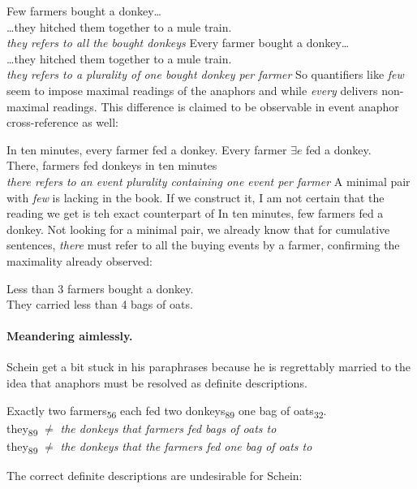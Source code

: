 \documentclass[english]{article}
\newcommand{\fg}{\color{darkred}}
\newcommand{\bg}{\color{blueish}}
\begin{document}
\pex
\a 
Few farmers bought a donkey\ldots\\
\ldots they hitched them together to a mule train.\\
\emph{they refers to all the bought donkeys}
\a 
Every farmer bought a donkey\ldots\\
\ldots they hitched them together to a mule train.\\
\emph{they refers to a plurality of one bought donkey per farmer}
\xe
%
So quantifiers like \emph{few} seem to impose maximal readings of the anaphors and while \emph{every} delivers non-maximal readings. This difference is claimed to be observable in event anaphor cross-reference as well:

\pex
\a 
In ten minutes, every farmer fed a donkey.
\a 
Every farmer $\exists e$ fed a donkey.\\
There, farmers fed donkeys in ten minutes\\
\emph{there refers to an event plurality containing one event per farmer}
\xe
%
A minimal pair with \emph{few} is lacking in the book. If we construct it, I am not certain that the reading we get is teh exact counterpart of \clastx 
\ex
In ten minutes, few farmers fed a donkey.
\xe
%
Not looking for a minimal pair, we already know that for cumulative sentences, \emph{there} must refer to all the buying events by a farmer, confirming the maximality already observed:

\ex
{\color{darkorange!84!black} Less than 3 farmers} bought {\fg a donkey}.\\
{\color{purple!93!black} They} carried {\color{bluegray!93!black} less than 4 bags of oats}.
\xe

\paragraph{Meandering aimlessly.} Schein get a bit stuck in his paraphrases because he is regrettably married to the idea that anaphors must be resolved as definite descriptions. 

\pex
{\bg Exactly two farmers}\textsubscript{56} each fed {\fg two donkeys}\textsubscript{89} {\color{purple} one bag of oats}\textsubscript{32}.\\
\a 
they\textsubscript{89} $\neq$ \emph{the donkeys that farmers fed bags of oats to}\\
they\textsubscript{89} $\neq$ \emph{the donkeys that the farmers fed one bag of oats to}
\a 

\xe
%
The correct definite descriptions are undesirable for Schein:
\end{document}
